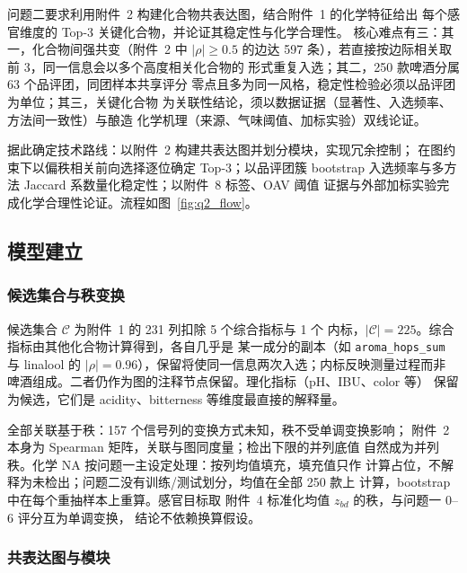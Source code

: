 \documentclass[12pt,a4paper]{article}
\begin{document}
问题二要求利用附件~2 构建化合物共表达图，结合附件~1 的化学特征给出
每个感官维度的 Top-3 关键化合物，并论证其稳定性与化学合理性。
核心难点有三：其一，化合物间强共变（附件~2 中 $|\rho|\ge0.5$ 的边达
597 条），若直接按边际相关取前 3，同一信息会以多个高度相关化合物的
形式重复入选；其二，250 款啤酒分属 63 个品评团，同团样本共享评分
零点且多为同一风格，稳定性检验必须以品评团为单位；其三，关键化合物
为关联性结论，须以数据证据（显著性、入选频率、方法间一致性）与酿造
化学机理（来源、气味阈值、加标实验）双线论证。

据此确定技术路线：以附件~2 构建共表达图并划分模块，实现冗余控制；
在图约束下以偏秩相关前向选择逐位确定 Top-3；以品评团簇 bootstrap
入选频率与多方法 Jaccard 系数量化稳定性；以附件~8 标签、OAV 阈值
证据与外部加标实验完成化学合理性论证。流程如图~\ref{fig:q2_flow}。


\subsection{模型建立}

\subsubsection{候选集合与秩变换}

候选集合 $\mathcal C$ 为附件~1 的 231 列扣除 5 个综合指标与 1 个
内标，$|\mathcal C|=225$。综合指标由其他化合物计算得到，各自几乎是
某一成分的副本（如 \verb|aroma_hops_sum| 与 linalool 的
$|\rho|=0.96$），保留将使同一信息两次入选；内标反映测量过程而非
啤酒组成。二者仍作为图的注释节点保留。理化指标（pH、IBU、color 等）
保留为候选，它们是 acidity、bitterness 等维度最直接的解释量。

全部关联基于秩：157 个信号列的变换方式未知，秩不受单调变换影响；
附件~2 本身为 Spearman 矩阵，关联与图同度量；检出下限的并列底值
自然成为并列秩。化学 NA 按问题一主设定处理：按列均值填充，填充值只作
计算占位，不解释为未检出；问题二没有训练/测试划分，均值在全部 250 款上
计算，bootstrap 中在每个重抽样本上重算。感官目标取
附件~4 标准化均值 $z_{bd}$ 的秩，与问题一 0--6 评分互为单调变换，
结论不依赖换算假设。

\subsubsection{共表达图与模块}
\end{document}
